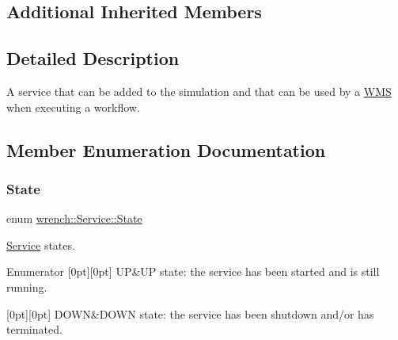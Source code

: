 \subsection*{Additional Inherited Members}


\subsection{Detailed Description}
A service that can be added to the simulation and that can be used by a \hyperlink{classwrench_1_1_w_m_s}{W\+MS} when executing a workflow. 

\subsection{Member Enumeration Documentation}
\mbox{\label{classwrench_1_1_service_a6f4e098718aa5d6f637c694de779e5c7}} 
\subsubsection{\texorpdfstring{State}{State}}
{\footnotesize\ttfamily enum \hyperlink{classwrench_1_1_service_a6f4e098718aa5d6f637c694de779e5c7}{wrench\+::\+Service\+::\+State}}



\hyperlink{classwrench_1_1_service}{Service} states. 

\begin{DoxyEnumFields}{Enumerator}
[0pt][0pt]{}\mbox{\label{classwrench_1_1_service_a6f4e098718aa5d6f637c694de779e5c7a4cd8bb98696ee5c7fb020b43af5b862e}} 
UP&UP state\+: the service has been started and is still running. \\
\hline

[0pt][0pt]{}\mbox{\label{classwrench_1_1_service_a6f4e098718aa5d6f637c694de779e5c7aa292425b049c40e72735a392958990c3}} 
D\+O\+WN&D\+O\+WN state\+: the service has been shutdown and/or has terminated. \\
\hline

\end{DoxyEnumFields}


